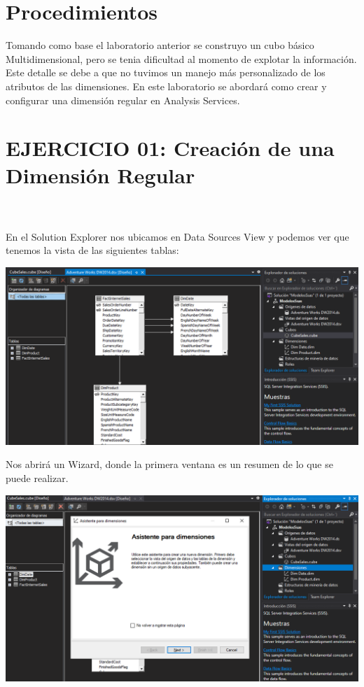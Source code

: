 \section{Procedimientos}

Tomando como base el laboratorio anterior se construyo un cubo básico Multidimensional, pero se tenia dificultad al momento de explotar la información. Este detalle se debe a que no tuvimos un manejo más personalizado de los atributos de las dimensiones. En este laboratorio se abordará como crear y configurar una dimensión regular en Analysis Services.
\begin{center}
\end{center}

\section{EJERCICIO 01: Creación de una Dimensión Regular} 

\textbf{}\\\\
En el Solution Explorer nos ubicamos en Data Sources View y podemos ver que tenemos la vista de las siguientes tablas:
\begin{center}
\includegraphics[width=\columnwidth]{images/task1/1}\newline
\end{center}

Nos abrirá un Wizard, donde la primera ventana es un resumen de lo que se puede realizar.
\begin{center}
\includegraphics[width=\columnwidth]{images/task1/2}\newline
\end{center}



